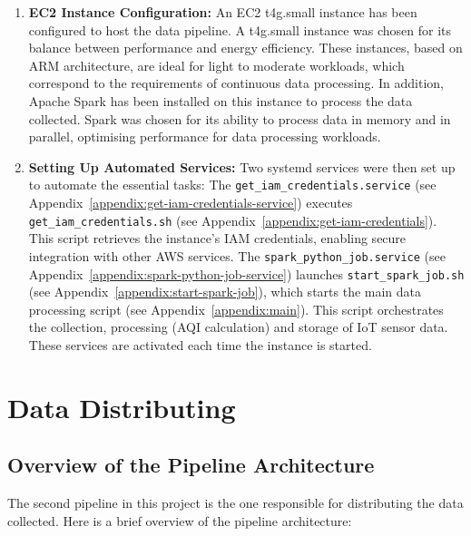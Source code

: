 \documentclass[12pt,oneside]{book} %
\begin{document}
\begin{enumerate}
    \item \textbf{EC2 Instance Configuration:} An EC2 t4g.small instance has been configured to host the data pipeline. A t4g.small instance was chosen for its balance between performance and energy efficiency. These instances, based on ARM architecture, are ideal for light to moderate workloads, which correspond to the requirements of continuous data processing. In addition, Apache Spark has been installed on this instance to process the data collected. Spark was chosen for its ability to process data in memory and in parallel, optimising performance for data processing workloads.
    \item \textbf{Setting Up Automated Services:} Two systemd services were then set up to automate the essential tasks: The \texttt{get\_iam\_credentials.service} (see Appendix~\ref{appendix:get-iam-credentials-service}) executes \texttt{get\_iam\_credentials.sh} (see Appendix~\ref{appendix:get-iam-credentials}). This script retrieves the instance's IAM credentials, enabling secure integration with other AWS services. The \texttt{spark\_python\_job.service} (see Appendix~\ref{appendix:spark-python-job-service}) launches \texttt{start\_spark\_job.sh} (see Appendix~\ref{appendix:start-spark-job}), which starts the main data processing script (see Appendix~\ref{appendix:main}). This script orchestrates the collection, processing (AQI calculation) and storage of IoT sensor data. These services are activated each time the instance is started.
\end{enumerate}

\newpage
\section{Data Distributing}

\subsection{Overview of the Pipeline Architecture}
The second pipeline in this project is the one responsible for distributing the
data collected. Here is a brief overview of the pipeline architecture:
\end{document}
